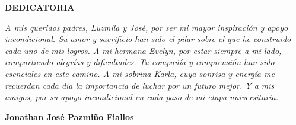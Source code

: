 \newpage
\vspace*{\fill}
\begin{flushright}
	\footnotesize
	\begin{minipage}{0.5\textwidth}
		\begin{flushright}
			\uppercase{\textbf{Dedicatoria}}
		\end{flushright}
		\itshape
		A mis queridos padres, Luzmila y José, por ser mi mayor inspiración y apoyo incondicional. Su amor y sacrificio
		han sido el pilar sobre el que he construido cada uno de mis logros. A mi hermana Evelyn, por estar siempre a mi
		lado, compartiendo alegrías y dificultades. Tu compañía y comprensión han sido esenciales en este camino. A mi
		sobrina Karla, cuya sonrisa y energía me recuerdan cada día la importancia de luchar por un futuro mejor. Y a mis
		amigos, por su apoyo incondicional en cada paso de mi etapa universitaria.
		\bigbreak
		\begin{flushright}
			\textbf{Jonathan José Pazmiño Fiallos}
		\end{flushright}
	\end{minipage}
\end{flushright}
\vspace*{\fill}
